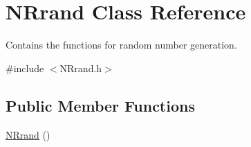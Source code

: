 \hypertarget{class_n_rrand}{}\section{N\+Rrand Class Reference}
\label{class_n_rrand}


Contains the functions for random number generation.  




{\ttfamily \#include $<$N\+Rrand.\+h$>$}

\subsection*{Public Member Functions}
\begin{DoxyCompactItemize}
\item 
\hyperlink{class_n_rrand_a674521c4c29a6cb692f343ea9cf6a40c}{N\+Rrand} ()\hypertarget{class_n_rrand_a674521c4c29a6cb692f343ea9cf6a40c}{}\label{class_n_rrand_a674521c4c29a6cb692f343ea9cf6a40c}


\end{DoxyCompactItemize}
